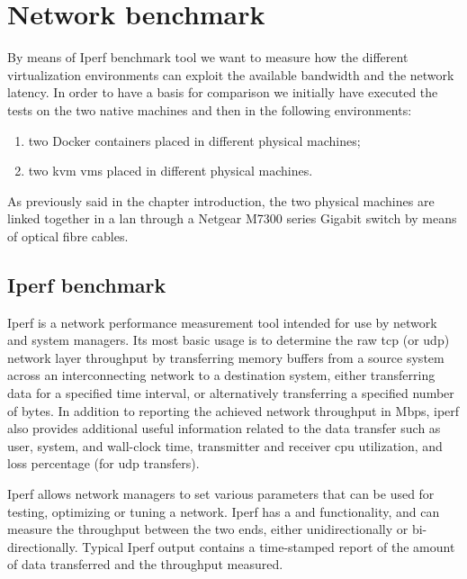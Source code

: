 %
%
\section{Network benchmark}
\label{sec:measurements-network}
By means of Iperf benchmark tool we want to measure how the different virtualization environments
can exploit the available bandwidth and the network latency. In order to have a basis for comparison 
we initially have executed the tests on the two native machines and then in the following environments:

\begin{enumerate}
	\item{two Docker containers placed in different physical machines;}
	\item{two \ac{kvm} \ac{vm}s placed in different physical machines.}
\end{enumerate}

As previously said in the chapter introduction, the two physical machines are linked together in a \acs{lan}
through a Netgear M7300 series Gigabit switch by means of optical fibre cables.

\subsection{Iperf benchmark}
\label{sec:measurements-network-nuttcp}
Iperf \cite{iperfBenchmark} is a network performance measurement tool intended for use by network and
system managers. Its most basic usage is to determine the raw \acs{tcp} (or \acs{udp}) network layer
throughput by transferring memory buffers from a source system across an interconnecting network to a
destination system, either transferring data for a specified time interval, or alternatively transferring
a specified number of bytes. In addition to reporting the achieved network throughput in Mbps, iperf also
provides additional useful information related to the data transfer such as user, system, and wall-clock time,
transmitter and receiver \acs{cpu} utilization, and loss percentage (for \acs{udp} transfers).

Iperf allows network managers to set various parameters that can be used for testing, optimizing
or tuning a network. Iperf has a  and  functionality, and can
measure the throughput between the two ends, either unidirectionally or bi-directionally. Typical Iperf output
contains a time-stamped report of the amount of data transferred and the throughput measured.

